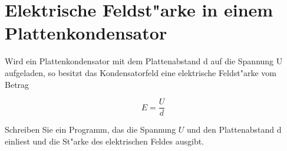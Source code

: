 \documentclass[a4paper,10pt]{article}
\begin{document}
\section{Elektrische Feldst"arke in einem Plattenkondensator}
Wird ein Plattenkondensator mit dem Plattenabstand d auf die Spannung U aufgeladen, so besitzt das Kondensatorfeld eine elektrische Feldst"arke vom Betrag

\begin{displaymath}
E = \frac{U}{d}
\end{displaymath}

Schreiben Sie ein Programm, das die Spannung $U$ und den Plattenabstand d einliest und die St"arke des elektrischen Feldes ausgibt.
\end{document}

